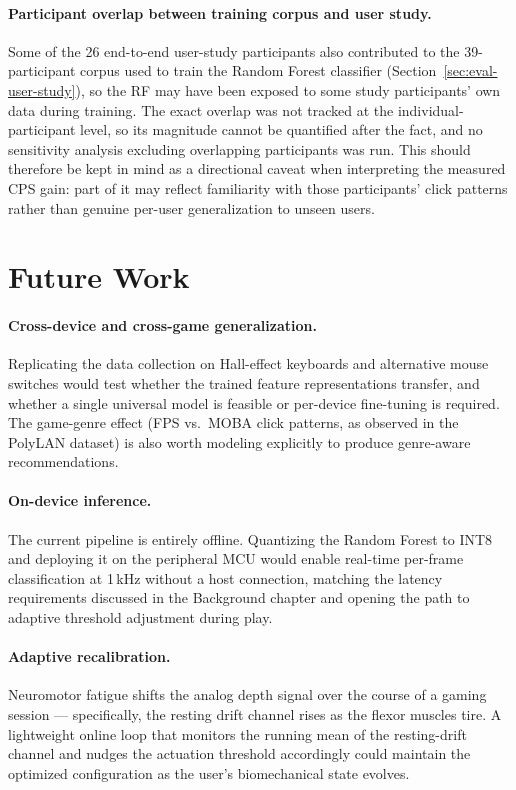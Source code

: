 \paragraph{Participant overlap between training corpus and user study.}
Some of the 26 end-to-end user-study participants also contributed to the
39-participant corpus used to train the Random Forest classifier
(Section~\ref{sec:eval-user-study}), so the RF may have been exposed to some
study participants' own data during training. The exact overlap was not
tracked at the individual-participant level, so its magnitude cannot be
quantified after the fact, and no sensitivity analysis excluding overlapping
participants was run. This should therefore be kept in mind as a directional
caveat when interpreting the measured CPS gain: part of it may reflect
familiarity with those participants' click patterns rather than genuine
per-user generalization to unseen users.

\section{Future Work}
\label{sec:conclusion-fw}

\paragraph{Cross-device and cross-game generalization.}
Replicating the data collection on Hall-effect keyboards and alternative mouse
switches would test whether the trained feature representations transfer, and whether
a single universal model is feasible or per-device fine-tuning is required.  The
game-genre effect (FPS vs.\ MOBA click patterns, as observed in the PolyLAN dataset)
is also worth modeling explicitly to produce genre-aware recommendations.

\paragraph{On-device inference.}
The current pipeline is entirely offline.  Quantizing the Random Forest to INT8 and
deploying it on the peripheral MCU would enable real-time per-frame classification at
1\,kHz without a host connection, matching the latency requirements discussed in the
Background chapter and opening the path to adaptive threshold adjustment during play.

\paragraph{Adaptive recalibration.}
Neuromotor fatigue shifts the analog depth signal over the course of a gaming session
--- specifically, the resting drift channel rises as the flexor muscles tire.  A
lightweight online loop that monitors the running mean of the resting-drift channel
and nudges the actuation threshold accordingly could maintain the optimized
configuration as the user's biomechanical state evolves.

